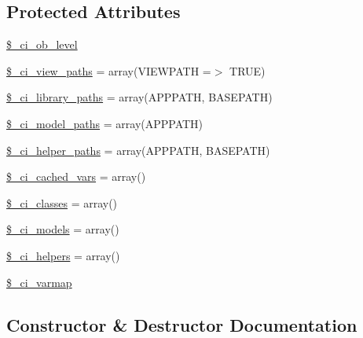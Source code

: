 \subsection*{Protected Attributes}
\begin{DoxyCompactItemize}
\item 
\mbox{\hyperlink{class_c_i___loader_a499cf11349613b24142f9c13aa83ee1b}{\$\+\_\+ci\+\_\+ob\+\_\+level}}
\item 
\mbox{\hyperlink{class_c_i___loader_adc48c64c673b28c2447ea4214a27eeea}{\$\+\_\+ci\+\_\+view\+\_\+paths}} = array(V\+I\+E\+W\+P\+A\+TH =$>$ T\+R\+UE)
\item 
\mbox{\hyperlink{class_c_i___loader_a2cafeab35438db8fc21754e311b14e09}{\$\+\_\+ci\+\_\+library\+\_\+paths}} = array(A\+P\+P\+P\+A\+TH, B\+A\+S\+E\+P\+A\+TH)
\item 
\mbox{\hyperlink{class_c_i___loader_ac5f53015a6bd6ce67af5e30cb156cce4}{\$\+\_\+ci\+\_\+model\+\_\+paths}} = array(A\+P\+P\+P\+A\+TH)
\item 
\mbox{\hyperlink{class_c_i___loader_a6ed0348d5a8afc689d71a234de8da95c}{\$\+\_\+ci\+\_\+helper\+\_\+paths}} = array(A\+P\+P\+P\+A\+TH, B\+A\+S\+E\+P\+A\+TH)
\item 
\mbox{\hyperlink{class_c_i___loader_a963cdc111da481606d2d67adf4c2947f}{\$\+\_\+ci\+\_\+cached\+\_\+vars}} = array()
\item 
\mbox{\hyperlink{class_c_i___loader_adad50876041bed7c7bf44aac03eb1162}{\$\+\_\+ci\+\_\+classes}} = array()
\item 
\mbox{\hyperlink{class_c_i___loader_adf3c08ef6905b17b2237bfa89d556f2c}{\$\+\_\+ci\+\_\+models}} = array()
\item 
\mbox{\hyperlink{class_c_i___loader_abc8797a91f1cdb473e2d0ad65dcbff55}{\$\+\_\+ci\+\_\+helpers}} = array()
\item 
\mbox{\hyperlink{class_c_i___loader_a8dd33a8ab99688451b1f811f122d1114}{\$\+\_\+ci\+\_\+varmap}}
\end{DoxyCompactItemize}


\subsection{Constructor \& Destructor Documentation}
\mbox{\label{class_c_i___loader_a095c5d389db211932136b53f25f39685}} 
